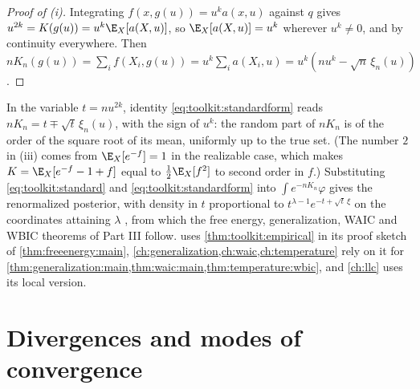 \begin{refsection}
\begin{proof}[Proof of (i)]
Integrating $f(x,g(u))=u^ka(x,u)$ against $q$ gives $u^{2k}=K(g(u))=u^k\E_X[a(X,u)]$, so $\E_X[a(X,u)]=u^k$ wherever $u^k\ne0$, and by continuity everywhere. Then $nK_n(g(u))=\sum_if(X_i,g(u))=u^k\sum_ia(X_i,u)=u^k(nu^k-\sqrt n\,\xi_n(u))$.
\end{proof}

In the variable $t=nu^{2k}$, identity \eqref{eq:toolkit:standardform} reads $nK_n=t\mp\sqrt t\,\xi_n(u)$, with the sign of $u^k$: the random part of $nK_n$ is of the order of the square root of its mean, uniformly up to the true set. (The number $2$ in (iii) comes from $\E_X[e^{-f}]=1$ in the realizable case, which makes $K=\E_X[e^{-f}-1+f]$ equal to $\frac12\E_X[f^2]$ to second order in $f$.) Substituting \eqref{eq:toolkit:standard} and \eqref{eq:toolkit:standardform} into $\int e^{-nK_n}\varphi$ gives the renormalized posterior, with density in $t$ proportional to $t^{\lambda-1}e^{-t+\sqrt t\,\xi}$ on the coordinates attaining $\lambda$ \parencite[eq.~(48)]{Watanabe2024}, from which the free energy, generalization, WAIC and WBIC theorems of Part III follow.  uses \cref{thm:toolkit:empirical} in its proof sketch of \cref{thm:freeenergy:main}, \cref{ch:generalization,ch:waic,ch:temperature} rely on it for \cref{thm:generalization:main,thm:waic:main,thm:temperature:wbic}, and \cref{ch:llc} uses its local version.

\section{Divergences and modes of convergence}\label{sec:toolkit:probability}


\end{refsection}
